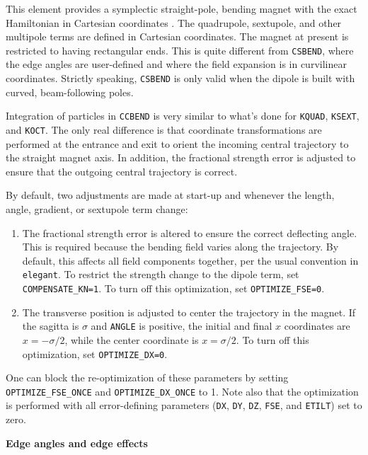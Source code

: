 This element provides a symplectic straight-pole, bending magnet with the exact
Hamiltonian in Cartesian coordinates \cite{Borland-LS356}.
The quadrupole, sextupole, and other multipole terms are defined in Cartesian coordinates.
The magnet at present is restricted to having rectangular ends.
This is quite different from \verb|CSBEND|, where the edge angles are user-defined and
where the field expansion is in curvilinear coordinates.
Strictly speaking, \verb|CSBEND| is only valid when the dipole is built with curved,
beam-following poles.

Integration of particles in \verb|CCBEND| is very similar to what's done for
\verb|KQUAD|, \verb|KSEXT|, and \verb|KOCT|. 
The only real difference is that coordinate transformations are performed at the
entrance and exit to orient the incoming central trajectory to the straight magnet axis.
In addition, the fractional strength error is adjusted to ensure that the 
outgoing central trajectory is correct.

By default, two adjustments are made at start-up and whenever the length, angle, 
gradient, or sextupole term change:
\begin{enumerate}
\item The fractional strength error is altered to ensure the correct deflecting angle. 
      This is required because the bending field varies along the trajectory.
      By default, this affects all field 
      components together, per the usual convention in {\tt elegant}. To restrict
      the strength change to the dipole term, set \verb|COMPENSATE_KN=1|.
      To turn off this optimization, set \verb|OPTIMIZE_FSE=0|.
\item The transverse position is adjusted to center the trajectory in the magnet.
      If the sagitta is $\sigma$ and \verb|ANGLE| is positive, the initial and final $x$ 
      coordinates are $x=-\sigma/2$, while the center coordinate is $x=\sigma/2$.
      To turn off this optimization, set \verb|OPTIMIZE_DX=0|.
\end{enumerate}
One can block the re-optimization of these parameters by setting 
\verb|OPTIMIZE_FSE_ONCE| and \verb|OPTIMIZE_DX_ONCE| to 1.
Note also that the optimization is performed with all error-defining parameters
(\verb|DX|, \verb|DY|, \verb|DZ|, \verb|FSE|, and \verb|ETILT|) set to zero.

{\bf Edge angles and edge effects} 

